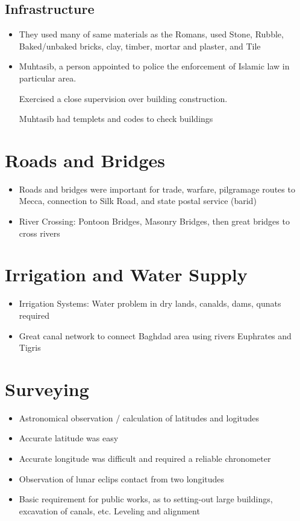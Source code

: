 \documentclass{article}
\begin{document}
\subsection{Infrastructure}

\begin{itemize}
  \item They used many of same materials as the Romans,
    used Stone, Rubble, Baked/unbaked bricks, clay, timber, mortar and plaster, and Tile
  \item Muhtasib, a person appointed to police the enforcement
    of Islamic law in particular area.

    Exercised a close supervision over building construction.

    Muhtasib had templets and codes to check buildings
\end{itemize}

\section*{Roads and Bridges}
\begin{itemize}
  \item Roads and bridges were important for trade,
    warfare, pilgramage routes to Mecca,
    connection to Silk Road,
    and state postal service (barid)
  \item River Crossing: Pontoon Bridges, Masonry Bridges,
    then great bridges to cross rivers
\end{itemize}

\section*{Irrigation and Water Supply}
\begin{itemize}
  \item Irrigation Systems:
    Water problem in dry lands, canalds, dams, qunats required
  \item Great canal network to connect Baghdad area using
    rivers Euphrates and Tigris
\end{itemize}

\section*{Surveying}
\begin{itemize}
  \item Astronomical observation / calculation of latitudes and logitudes
  \item Accurate latitude was easy
  \item Accurate longitude was difficult and required a reliable chronometer
  \item Observation of lunar eclips contact from two longitudes
  \item Basic requirement for public works, as to setting-out large buildings,
    excavation of canals, etc. Leveling and alignment
\end{itemize}
\end{document}
